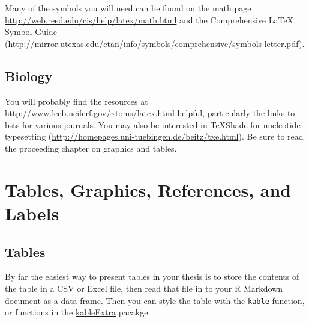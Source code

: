 \documentclass[twoside,12pt,final]{ucthesis-CA2012}
\begin{document}
\begin{ucmainmatter}
Many of the symbols you will need can be found on the math page
\url{http://web.reed.edu/cis/help/latex/math.html} and the Comprehensive
LaTeX Symbol Guide
(\url{http://mirror.utexas.edu/ctan/info/symbols/comprehensive/symbols-letter.pdf}).

\hypertarget{biology}{%
\section{Biology}\label{biology}}

You will probably find the resources at
\url{http://www.lecb.ncifcrf.gov/~toms/latex.html} helpful, particularly
the links to bsts for various journals. You may also be interested in
TeXShade for nucleotide typesetting
(\url{http://homepages.uni-tuebingen.de/beitz/txe.html}). Be sure to
read the proceeding chapter on graphics and tables.

\hypertarget{ref-labels}{%
\chapter{Tables, Graphics, References, and Labels}\label{ref-labels}}

\hypertarget{tables}{%
\section{Tables}\label{tables}}

By far the easiest way to present tables in your thesis is to store the
contents of the table in a CSV or Excel file, then read that file in to
your R Markdown document as a data frame. Then you can style the table
with the \texttt{kable} function, or functions in the
\href{https://cran.r-project.org/web/packages/kableExtra/index.html}{kableExtra}
pacakge.


\end{ucmainmatter}
\end{document}
